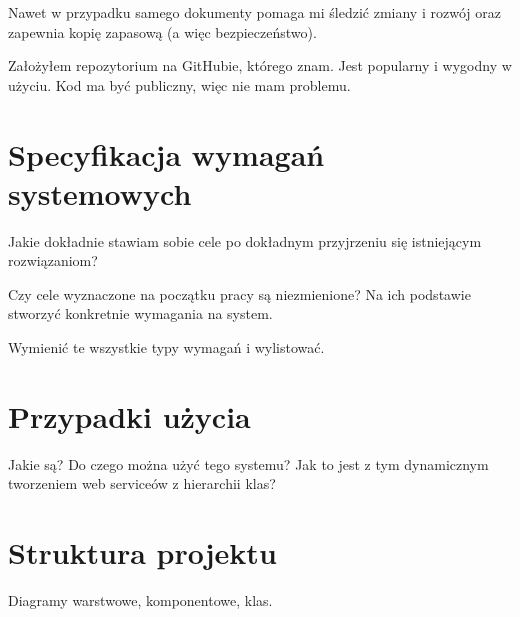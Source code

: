 Nawet w przypadku samego dokumenty pomaga mi śledzić zmiany i rozwój oraz zapewnia kopię zapasową (a więc bezpieczeństwo).

Założyłem repozytorium na GitHubie, którego znam. Jest popularny i wygodny w użyciu. Kod ma być publiczny, więc nie mam problemu. 



\section{Specyfikacja wymagań systemowych}
Jakie dokładnie stawiam sobie cele po dokładnym przyjrzeniu się istniejącym rozwiązaniom?

Czy cele wyznaczone na początku pracy są niezmienione? Na ich podstawie stworzyć konkretnie wymagania na system.

Wymienić te wszystkie typy wymagań i wylistować.




\section{Przypadki użycia}
Jakie są? Do czego można użyć tego systemu? Jak to jest z tym dynamicznym tworzeniem web serviceów z hierarchii klas?



\section{Struktura projektu}
Diagramy warstwowe, komponentowe, klas.

